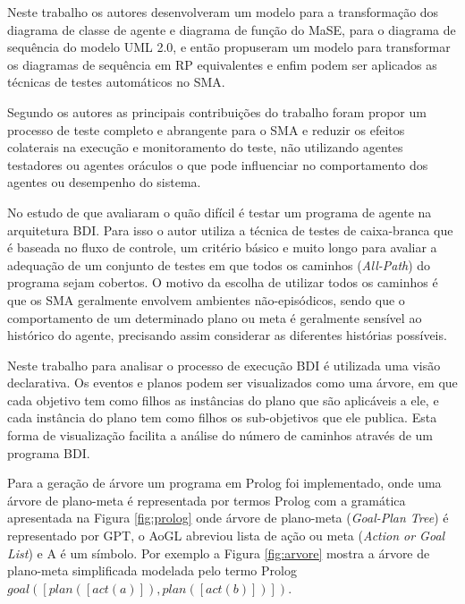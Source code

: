 Neste trabalho os autores desenvolveram um modelo para a transformação dos diagrama de classe de agente e diagrama de função do MaSE, para o diagrama de sequência do modelo UML 2.0, e então propuseram um modelo para transformar os diagramas de sequência em RP equivalentes e enfim podem ser aplicados as técnicas de testes automáticos no SMA.

Segundo os autores as principais contribuições do trabalho foram propor um processo de teste completo e abrangente para o SMA e reduzir os efeitos colaterais na execução e monitoramento do teste, não utilizando agentes testadores ou agentes oráculos o que pode influenciar no comportamento dos agentes ou desempenho do sistema.


No estudo de \cite{winikoff2014testability} que avaliaram o quão difícil é testar um programa de agente na arquitetura BDI. Para isso o autor utiliza a técnica de testes de caixa-branca que é baseada no fluxo de controle, um critério básico e muito longo para avaliar a adequação de um conjunto de testes em que todos os caminhos (\textit{All-Path}) do programa sejam cobertos. O motivo da escolha de utilizar todos os caminhos é que os SMA geralmente envolvem ambientes não-episódicos, sendo que o comportamento de um determinado plano ou meta é geralmente sensível ao histórico do agente, precisando assim considerar as diferentes histórias possíveis.

Neste trabalho para analisar o processo de execução BDI é utilizada uma visão declarativa. Os eventos e planos podem ser visualizados como uma árvore, em que cada objetivo tem como filhos as instâncias do plano que são aplicáveis a ele, e cada instância do plano tem como filhos os sub-objetivos que ele publica. Esta forma de visualização facilita a análise do número de caminhos através de um programa BDI.

Para a geração de árvore um programa em Prolog foi implementado, onde uma árvore de plano-meta é representada por termos Prolog com a gramática apresentada na Figura \ref{fig:prolog} onde árvore de plano-meta (\textit{Goal-Plan Tree}) é representado por GPT, o AoGL abreviou lista de ação ou meta (\textit{Action or Goal List}) e A é um símbolo. Por exemplo a Figura \ref{fig:arvore} mostra a árvore de plano-meta simplificada modelada pelo termo Prolog \begin{math} goal\left ( \left [ plan\left ( \left [ act\left ( a \right ) \right ] \right ),plan\left ( \left [ act\left ( b \right ) \right ] \right ) \right ] \right )\end{math}.

